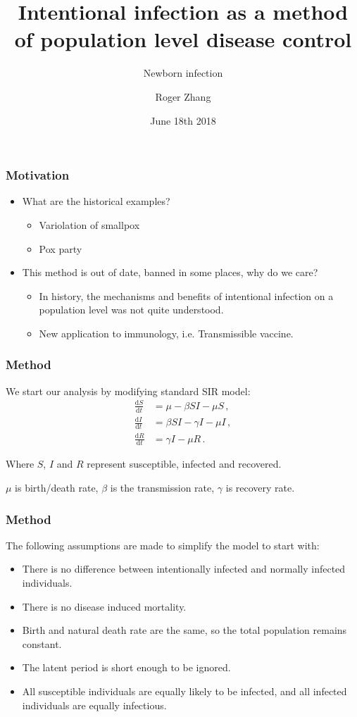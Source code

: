 \documentclass{beamer}
\title{Intentional infection as a method of population level disease control}
\subtitle{Newborn infection}
\author{Roger Zhang}
\date{June 18th 2018}
\institute{McMaster University Department of Mathematics}
\newcommand\dbyd[2]{\frac{\mathrm d{#1}}{\mathrm d{#2}}}
\begin{document}
\begin{frame}
\titlepage
\end{frame}
\begin{frame}
\frametitle{Motivation}
\begin{itemize}
\item What are the historical examples?
\pause
\begin{itemize}
\item Variolation of smallpox
\item Pox party
\end{itemize}
\pause
\item This method is out of date, banned in some places, why do we care?
\pause
\begin{itemize}
\item In history, the mechanisms and benefits of intentional infection  on a population level was not quite understood.
\item New application to immunology, i.e. Transmissible vaccine.
\end{itemize}
\end{itemize}
\end{frame}
\begin{frame}
\frametitle{Method}
We start our analysis by modifying standard SIR model:
\pause
\begin{equation}\label{1}
\begin{split}
\dbyd{S}{t}&=\mu- \beta SI-\mu S \,,\\
\dbyd{I}{t}&=\beta SI-\gamma I -\mu I\,,\\
\dbyd{R}{t}&=\gamma I-\mu R\,.
\end{split}
\end{equation}

Where $S$, $I$ and $R$ represent susceptible, infected and recovered.

$\mu$ is birth/death rate, $\beta$ is the transmission rate, $\gamma$ is recovery rate. 
\end{frame}
\begin{frame}
\frametitle{Method}
The following assumptions are made to simplify the model to start with:
\begin{itemize}\itemsep10pt
\item There is no difference between intentionally infected and normally infected individuals.
\item There is no disease induced mortality.
\item Birth and natural death rate are the same, so the total population remains constant.
\item The latent period is short enough to be ignored.
\item All susceptible individuals are equally likely to be infected, and all infected individuals are equally infectious.
\end{itemize}
\end{frame}
\end{document}
